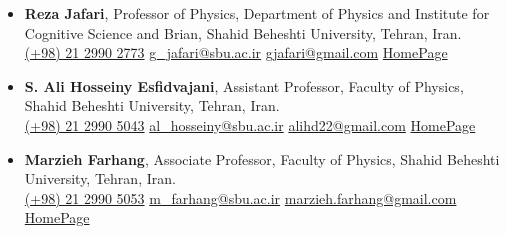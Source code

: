 \documentclass[12pt, b4paper]{cv}
\begin{document}
\begin{itemize}
	\item \textbf{Reza Jafari}, Professor of Physics, Department of Physics and Institute for Cognitive Science and Brian, Shahid Beheshti University, Tehran, Iran.\\
	\href{tel:(+98)2129902773}{ (+98) 21 2990 2773}
	\hspace{0.5in}
	\href{mailto:g\_jafari@sbu.ac.ir}{ g\_jafari@sbu.ac.ir}
	\hspace{0.75in}
	\href{mailto:gjafari@gmail.com}{ gjafari@gmail.com}
	\hspace{1.14in}
	\href{https://complexity.sbu.ac.ir/professor-reza-jafari/}{HomePage} 
	\item \textbf{S. Ali Hosseiny Esfidvajani}, Assistant Professor, Faculty of Physics, Shahid Beheshti University, Tehran, Iran.\\
	\href{tel:(+98)2129905043}{ (+98) 21 2990 5043}
	\hspace{0.5in}
	\href{mailto:al\_hosseiny@sbu.ac.ir}{ al\_hosseiny@sbu.ac.ir}
	\hspace{0.5in}
	\href{mailto:alihd22@gmail.com}{ alihd22@gmail.com}
	\hspace{1.091in}
	\href{https://alihosseiny.com/}{HomePage} 
	\item \textbf{Marzieh Farhang}, Associate Professor, Faculty of Physics, Shahid Beheshti University, Tehran, Iran.\\
	\href{tel:(+98)2129905053}{ (+98) 21 2990 5053}
	\hspace{0.5in}
	\href{mailto:m\_farhang@sbu.ac.ir}{ m\_farhang@sbu.ac.ir}
	\hspace{0.54in}
	\href{mailto:marzieh.farhang@gmail.com}{ marzieh.farhang@gmail.com}
	\hspace{0.5in}
	\href{https://en.sbu.ac.ir/~m_farhang/home}{HomePage} 
\end{itemize}
\end{document}
